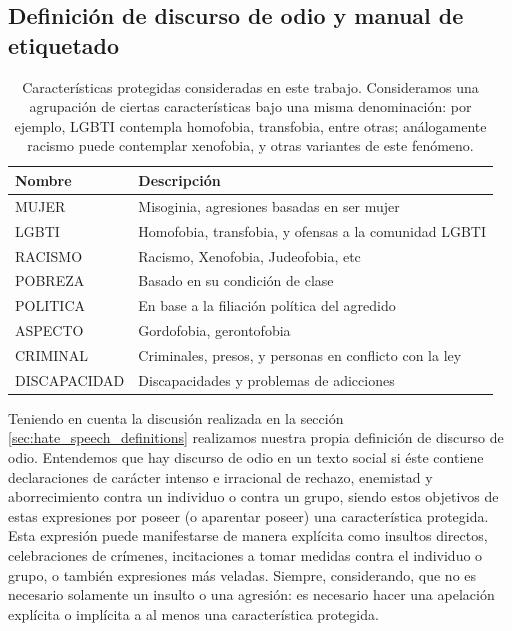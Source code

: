 \subsection{Definición de discurso de odio y manual de etiquetado}
\label{sec:05_hate_speech_definition}
\begin{table}[t]
    \centering
    \small
    \begin{tabularx}{\textwidth}{l X}
        Nombre & Descripción \\
        \hline
        MUJER        & Misoginia, agresiones basadas en ser mujer  \\
        LGBTI        & Homofobia, transfobia, y ofensas a la comunidad LGBTI \\
        RACISMO      & Racismo, Xenofobia, Judeofobia, etc \\
        POBREZA      & Basado en su condición de clase \\
        POLITICA     & En base a la filiación política del agredido \\
        ASPECTO      & Gordofobia, gerontofobia \\
        CRIMINAL     & Criminales, presos, y personas en conflicto con la ley \\
        DISCAPACIDAD & Discapacidades y problemas de adicciones \\
        \hline
    \end{tabularx}
    \caption{Características protegidas consideradas en este trabajo. Consideramos una agrupación de ciertas características bajo una misma denominación: por ejemplo, LGBTI contempla homofobia, transfobia, entre otras; análogamente racismo puede contemplar xenofobia, y otras variantes de este fenómeno. }
    \label{tab:caracteristicas_protegidas}
\end{table}


Teniendo en cuenta la discusión realizada en la sección \ref{sec:hate_speech_definitions} realizamos nuestra propia definición de discurso de odio. Entendemos que hay discurso de odio en un texto social si éste contiene declaraciones de carácter intenso e irracional de rechazo, enemistad y aborrecimiento contra un individuo o contra un grupo, siendo estos objetivos de estas expresiones por poseer (o aparentar poseer) una característica protegida. Esta expresión puede manifestarse de manera explícita como insultos directos, celebraciones de crímenes, incitaciones a tomar medidas contra el individuo o grupo, o también expresiones más veladas. Siempre, considerando, que no es necesario solamente un insulto o una agresión: es necesario hacer una apelación explícita o implícita a al menos una característica protegida.

